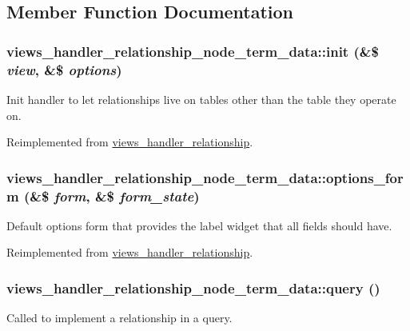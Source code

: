 \subsection{Member Function Documentation}
\hypertarget{classviews__handler__relationship__node__term__data_a85e3c68c3338ca221d436eb13914bd68}{
\subsubsection[{init}]{\setlength{\rightskip}{0pt plus 5cm}views\_\-handler\_\-relationship\_\-node\_\-term\_\-data::init (\&\$ {\em view}, \/  \&\$ {\em options})}}
\label{classviews__handler__relationship__node__term__data_a85e3c68c3338ca221d436eb13914bd68}
Init handler to let relationships live on tables other than the table they operate on. 

Reimplemented from \hyperlink{classviews__handler__relationship_a33b2a40a9ddca4256d455137a28c4aa0}{views\_\-handler\_\-relationship}.\hypertarget{classviews__handler__relationship__node__term__data_a976c536bb78f58c8919b95917a84d2bd}{
\subsubsection[{options\_\-form}]{\setlength{\rightskip}{0pt plus 5cm}views\_\-handler\_\-relationship\_\-node\_\-term\_\-data::options\_\-form (\&\$ {\em form}, \/  \&\$ {\em form\_\-state})}}
\label{classviews__handler__relationship__node__term__data_a976c536bb78f58c8919b95917a84d2bd}
Default options form that provides the label widget that all fields should have. 

Reimplemented from \hyperlink{classviews__handler__relationship_a08cc3f5947964d936b5e88d198f82c30}{views\_\-handler\_\-relationship}.\hypertarget{classviews__handler__relationship__node__term__data_a52e14dbfdfd8ca850baa9fbd4880836d}{
\subsubsection[{query}]{\setlength{\rightskip}{0pt plus 5cm}views\_\-handler\_\-relationship\_\-node\_\-term\_\-data::query ()}}
\label{classviews__handler__relationship__node__term__data_a52e14dbfdfd8ca850baa9fbd4880836d}
Called to implement a relationship in a query. 

